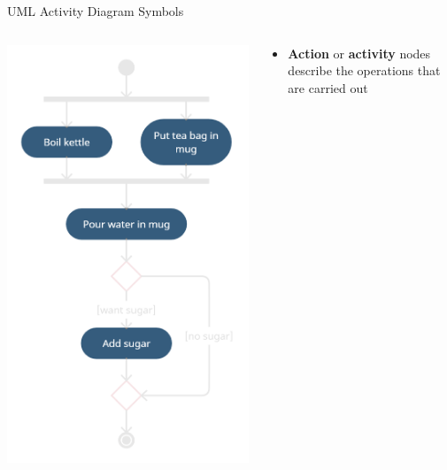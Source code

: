 \begin{frame}{UML Activity Diagram Symbols}
	\begin{columns}
		\begin{column}{0.4\textwidth}
			\includegraphics[width=\textwidth]{ad_action}
		\end{column}
		\begin{column}{0.58\textwidth}
			\begin{itemize}
				\pause\item \textbf{Action} or \textbf{activity} nodes describe the operations that are carried out
			\end{itemize}
		\end{column}
	\end{columns}
\end{frame}

